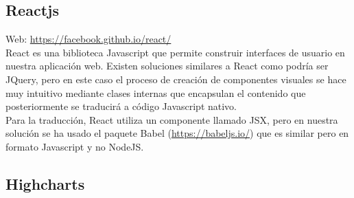 \subsection{Reactjs}


Web: \url{https://facebook.github.io/react/}\\

React es una biblioteca Javascript que permite construir interfaces de usuario en nuestra aplicación web. Existen soluciones similares a React como podría ser JQuery, pero en este caso el proceso de creación de componentes visuales se hace muy intuitivo mediante clases internas que encapsulan el contenido que posteriormente se traducirá a código Javascript nativo.\\

Para la traducción, React utiliza un componente llamado JSX, pero en nuestra solución se ha usado el paquete Babel (\url{https://babeljs.io/}) que es similar pero en formato Javascript y no NodeJS.\\

\subsection{Highcharts}

